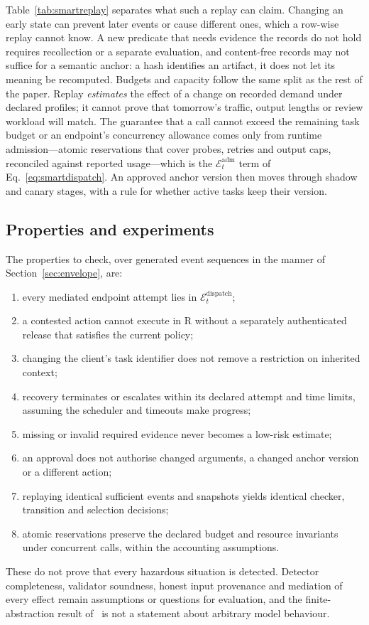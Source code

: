 \documentclass[11pt]{article}
\newcommand{\E}{\mathcal{E}}
\begin{document}
Table~\ref{tab:smartreplay} separates what such a replay can claim. Changing an early state can
prevent later events or cause different ones, which a row-wise replay cannot know. A new
predicate that needs evidence the records do not hold requires recollection or a separate
evaluation, and content-free records may not suffice for a semantic anchor: a hash identifies
an artifact, it does not let its meaning be recomputed. Budgets and capacity follow the same
split as the rest of the paper. Replay \emph{estimates} the effect of a change on recorded demand
under declared profiles; it cannot prove that tomorrow's traffic, output lengths or review
workload will match. The guarantee that a call cannot exceed the remaining task budget or an
endpoint's concurrency allowance comes only from runtime admission---atomic reservations that
cover probes, retries and output caps, reconciled against reported usage---which is the
$\E_t^{\mathrm{adm}}$ term of Eq.~\eqref{eq:smartdispatch}. An approved anchor version then
moves through shadow and canary stages, with a rule for whether active tasks keep their version.

\subsection{Properties and experiments}
\label{sec:smart-props}

The properties to check, over generated event sequences in the manner of
Section~\ref{sec:envelope}, are:
\begin{enumerate}
  \item every mediated endpoint attempt lies in $\E_t^{\mathrm{dispatch}}$;
  \item a contested action cannot execute in R without a separately authenticated release that
    satisfies the current policy;
  \item changing the client's task identifier does not remove a restriction on inherited
    context;
  \item recovery terminates or escalates within its declared attempt and time limits, assuming
    the scheduler and timeouts make progress;
  \item missing or invalid required evidence never becomes a low-risk estimate;
  \item an approval does not authorise changed arguments, a changed anchor version or a
    different action;
  \item replaying identical sufficient events and snapshots yields identical checker, transition
    and selection decisions;
  \item atomic reservations preserve the declared budget and resource invariants under
    concurrent calls, within the accounting assumptions.
\end{enumerate}
These do not prove that every hazardous situation is detected. Detector completeness, validator
soundness, honest input provenance and mediation of every effect remain assumptions or
questions for evaluation, and the finite-abstraction result of~\cite{smartbounded} is not a
statement about arbitrary model behaviour.
\end{document}
